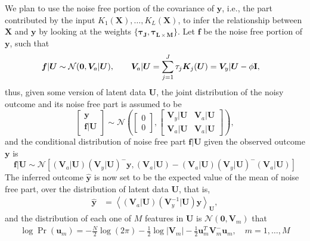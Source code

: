 \documentclass[11pt]{article}
\newcommand{\bs}{\boldsymbol}
\newcommand{\mean}[2]{\left\langle{#1}\right\rangle_{#2}}
\newcommand{\vf}{\boldsymbol{f}}
\newcommand{\vu}{\boldsymbol{u}}
\newcommand{\vy}{\boldsymbol{y}}
\newcommand{\xv}{\boldsymbol{V}}
\newcommand{\xk}{\boldsymbol{K}}
\newcommand{\xx}{\boldsymbol{X}}
\newcommand{\xu}{\boldsymbol{U}}
\newcommand{\vyh}{\hat{\vy}}
\newcommand{\id}{\textrm{\textbf{I}}}
\begin{document}
We plan to use the noise free portion of the covariance of $\vy$, i.e., the part contributed by the input $K_1(\xx), \dots, K_L(\xx)$, to infer the relationship between $\xx$ and $\vy$ by looking at the weights $\{\bs{\tau_J}, \bs{\tau_{L \times M}}\}$. Let $\vf$ be the noise free portion of $\vy$, such that
\begin{align*}
  \vf|\xu & \sim \mathcal{N}(\bs{0}, \xv_a|\xu), \qquad \xv_a|\xu = \sum_{j=1}^J \tau_j \xk_j(\xu) = \xv_y|\xu - \phi\id,
\end{align*}
thus, given some version of latent data $\xu$, the joint distribution of the noisy outcome and its noise free part is assumed to be
\begin{equation*}
  \left[
    \begin{array}{c}
      \vy \\
      \vf|\xu
    \end{array}
  \right] \sim
  \mathcal{N}\left( 
    \left[
      \begin{array}{c}
        0 \\
        0
      \end{array}
    \right],
    \left[
      \begin{array}{cc}
        \xv_y|\xu & \xv_a|\xu \\
        \xv_a|\xu & \xv_a|\xu
      \end{array}
    \right]
  \right),
\end{equation*}
and the conditional distribution of noise free part $\vf|\xu$ given the observed outcome $\vy$ is
\begin{equation*}
  \vf|\xu \sim \mathcal{N} \left[(\xv_a|\xu)(\xv_y|\xu)^- \vy, (\xv_a|\xu) - (\xv_a|\xu)(\xv_y|\xu)^-(\xv_a|\xu) \right]
\end{equation*}
The inferred outcome $\vyh$ is now set to be the expected value of the mean of noise free part, over the distribution of latent data $\xu$, that is,
\begin{align}\label{eq:yht}
  \vyh       &= \mean{(\xv_a|\xu) (\xv_y^{-1}|\xu)\vy}{\xu},
\end{align}
and the distribution of each one of $M$ features in $\xu$ is $\mathcal{N}(\bs{0}, \xv_m)$ that
\begin{align}\label{eq:uds}
  \log{\Pr(\vu_m)} = -\frac{N}{2}\log{(2\pi)} -\frac{1}{2}\log{|\xv_m|} -\frac{1}{2}\vu_m^T \xv_m^- \vu_m, \quad m=1, \dots, M
\end{align}
\end{document}
